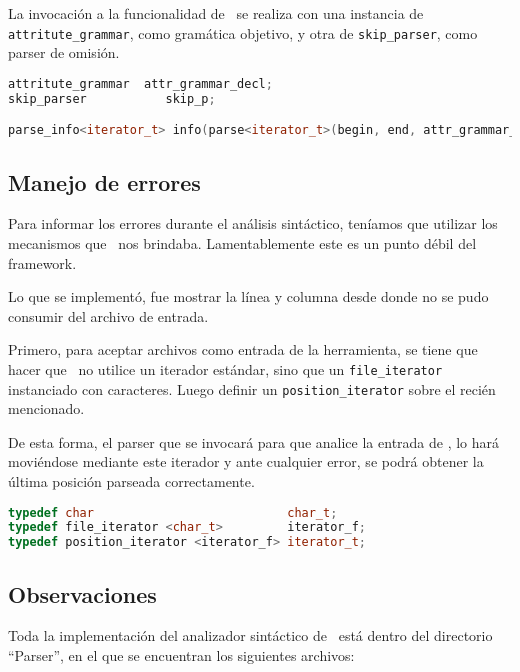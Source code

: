 La invocación a la funcionalidad de \spirit\ se realiza con una instancia de \texttt{attritute\_grammar}, como gramática objetivo, y otra de \texttt{skip\_parser}, como parser de omisión.

\begin{lstlisting}[language=C++, basicstyle=\scriptsize, columns=fullflexible, linewidth=13cm]
attritute_grammar  attr_grammar_decl;
skip_parser           skip_p;

parse_info<iterator_t> info(parse<iterator_t>(begin, end, attr_grammar_decl, skip_p));
\end{lstlisting}

\subsection{Manejo de errores}

Para informar los errores durante el análisis sintáctico, teníamos que utilizar los mecanismos que \spirit\ nos brindaba. Lamentablemente este es un punto débil del framework.

Lo que se implementó, fue mostrar la línea y columna desde donde no se pudo consumir del archivo de entrada.

Primero, para aceptar archivos como entrada de la herramienta, se tiene que hacer que \spirit\ no utilice un iterador estándar, sino que un \texttt{file\_iterator} instanciado con caracteres. Luego definir un \texttt{position\_iterator} sobre el recién mencionado.

De esta forma, el parser que se invocará para que analice la entrada de \maggen, lo hará moviéndose mediante este iterador y ante cualquier error, se podrá obtener la última posición parseada correctamente.

\begin{lstlisting}[language=C++, basicstyle=\scriptsize, linewidth=10cm]
typedef char                           char_t;
typedef file_iterator <char_t>         iterator_f;
typedef position_iterator <iterator_f> iterator_t;
\end{lstlisting}

\subsection{Observaciones}

Toda la implementación del analizador sintáctico de \maggen\ está dentro del directorio ``Parser'', en el que se encuentran los siguientes archivos:

